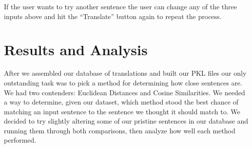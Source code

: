 \documentclass[runningheads]{llncs}
\begin{document}
	\begin{minipage}{\linewidth}
		\begin{center}
  			 \noindent{}
			\label{fig:Display Translations}
			\vspace*{1cm}
		\end{center}
	\end{minipage}
	\afterpage{\clearpage}
If the user wants to try another sentence the user can change any of the three inputs above and hit the ``Translate'' button again to repeat the process.

	\section{Results and Analysis}
	After we assembled our database of translations and built our PKL files our only outstanding task was to pick a method for determining how close sentences are. We had two contenders: Euclidean Distances and Cosine Similarities. We needed a way to determine, given our dataset, which method stood the best chance of matching an input sentence to the sentence we thought it should match to. We decided to try slightly altering some of our pristine sentences in our database and running them through both comparisons, then analyze how well each method performed.
\end{document}
